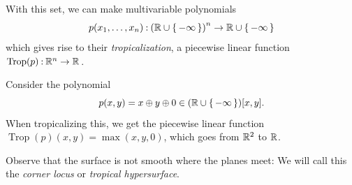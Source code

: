 \documentclass[12pt]{memoir}
\DeclareMathOperator{\Trop}{Trop}
\theoremstyle{definition}
\begin{document}
With this set, we can make multivariable polynomials 
$$p(x_1,\dots,x_n)\mathbin{:}\left(\mathbb{R}\cup\{\,-\infty\,\}\right)^n\to\mathbb{R}\cup\{\,-\infty\,\}$$
which gives rise to their \emph{tropicalization}, a piecewise linear function $\Trop(p)\:\bR^n\to\bR$.



\begin{Ex}
    Consider the polynomial 
    $$p(x,y)=x\oplus y\oplus 0\in (\mathbb{R}\cup\{\,-\infty\,\})[x,y].$$
    When tropicalizing this, we get the piecewise linear function $\Trop(p)(x,y)=\max(x,y,0)$, which goes from $\mathbb{R}^2$ to $\mathbb{R}$.
    \begin{figure}[h!]
        \centering
        \quad
        \quad
        \label{fig:2.1-and-2.2-and-2.3}
    \end{figure}
    Observe that the surface is not smooth where the planes meet: We will call this the \emph{corner locus} or \emph{tropical hypersurface}.
\end{Ex}
\end{document}

